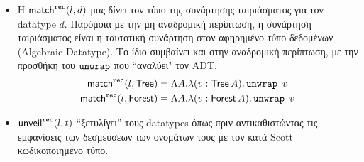 \begin{itemize}
  \item Η $\mathsf{match}^{\operatorname{\texttt{rec}}}(l, d)$ μας δίνει τον τύπο της συνάρτησης ταιριάσματος για τον datatype $d$. Παρόμοια
  με την μη αναδρομική περίπτωση, η συνάρτηση ταιριάσματος είναι η ταυτοτική  συνάρτηση στον αφηρημένο τύπο δεδομένων (Algebraic Datatype). Το ίδιο συμβαίνει και στην αναδρομική περίπτωση, με την προσθήκη του  $\operatorname{\texttt{unwrap}}$ που ``αναλύει" τον ADT.
    \begin{align*}
    \mathsf{match}^{\operatorname{\texttt{rec}}}(l, \operatorname{\textsf{Tree}}) &= \Lambda A . \lambda (v : \operatorname{\textsf{Tree}} A) . \operatorname{\texttt{unwrap}}\ v\\
    \mathsf{match}^{\operatorname{\texttt{rec}}}(l, \operatorname{\textsf{Forest}}) &= \Lambda A . \lambda (v : \operatorname{\textsf{Forest}} A) . \operatorname{\texttt{unwrap}}\ v
    \end{align*}
  \item $\mathsf{unveil}^{\operatorname{\texttt{rec}}}(l, t)$ ``ξετυλίγει'' τους datatypes όπως πριν αντικαθιστώντας τις
  εμφανίσεις των δεσμεύσεων των ονομάτων τους με τον κατά Scott κωδικοποιημένο τύπο.
\end{itemize}
